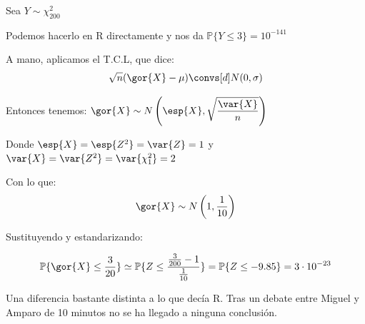 \begin{problem}[3]
\spart Sea $Y \sim \chi_{200}^2$ 

Podemos hacerlo en R directamente y nos da $\mathbb{P}\{Y\leq 3\} = 10 ^{-141}$

A mano, aplicamos el T.C.L, que dice:
\[\sqrt{n}(\gor{X} - \mu) \convs[d] N(0,\sigma)  \]

Entonces tenemos: $\gor{X} \sim N\left(\esp{X},\displaystyle \sqrt{\frac{\var{X}}{n}}\right)$

Donde $\esp{X} = \esp{Z^2} = \var{Z} = 1$ y $\var{X} = \var{Z^2} = \var{\chi_1^2} = 2$

Con lo que:
\[\gor{X} \sim N\left(1,\frac{1}{10}\right)\]

Sustituyendo y estandarizando:

\[
\mathbb{P}\{\gor{X}\leq\frac{3}{20} \} \simeq \mathbb{P} \{Z\leq \frac{\frac{3}{200} - 1}{\frac{1}{10}} \} = \mathbb{P} \{Z\leq -9.85\} = 3 \cdot 10^{-23}
\]

Una diferencia bastante distinta a lo que decía R. Tras un debate entre Miguel y Amparo de 10 minutos no se ha llegado a ninguna conclusión.
\end{problem}

